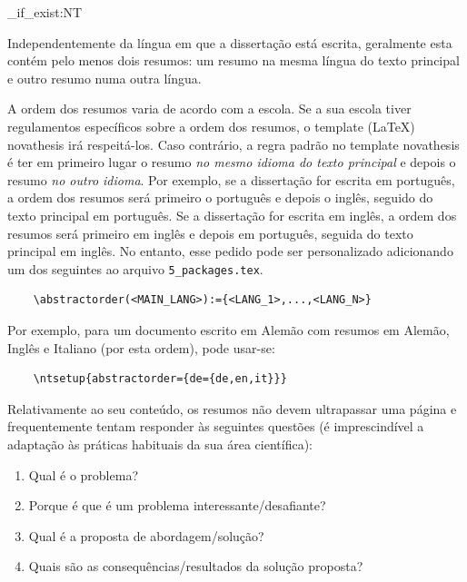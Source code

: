 
\ExplSyntaxOn
\cs_if_exist:NT \TitleOnHeader
  { \TitleOnHeader }
\ExplSyntaxOff

%

Independentemente da língua em que a dissertação está escrita, geralmente esta contém pelo menos dois resumos: um resumo na mesma língua do texto principal e outro resumo numa outra língua.

A ordem dos resumos varia de acordo com a escola. Se a sua escola tiver regulamentos específicos sobre a ordem dos resumos, o template (\LaTeX) \gls{novathesis} irá respeitá-los. Caso contrário, a regra padrão no template \gls{novathesis} é ter em primeiro lugar o resumo \emph{no mesmo idioma do texto principal} e depois o resumo \emph{no outro idioma}. Por exemplo, se a dissertação for escrita em português, a ordem dos resumos será primeiro o português e depois o inglês, seguido do texto principal em português. Se a dissertação for escrita em inglês, a ordem dos resumos será primeiro em inglês e depois em português, seguida do texto principal em inglês.
%
No entanto, esse pedido pode ser personalizado adicionando um dos seguintes ao arquivo \verb+5_packages.tex+.

\begin{verbatim}
    \abstractorder(<MAIN_LANG>):={<LANG_1>,...,<LANG_N>}
\end{verbatim}

Por exemplo, para um documento escrito em Alemão com resumos em Alemão, Inglês e Italiano (por esta ordem), pode usar-se:
\begin{verbatim}
    \ntsetup{abstractorder={de={de,en,it}}}
\end{verbatim}

Relativamente ao seu conteúdo, os resumos não devem ultrapassar uma página e frequentemente tentam responder às seguintes questões (é imprescindível a adaptação às práticas habituais da sua área científica):

\begin{enumerate}
  \item Qual é o problema?
  \item Porque é que é um problema interessante/desafiante?
  \item Qual é a proposta de abordagem/solução?
  \item Quais são as consequências/resultados da solução proposta?
\end{enumerate}

